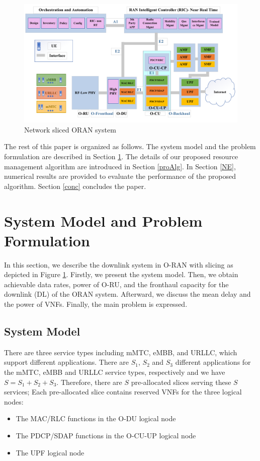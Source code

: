 \documentclass[conference]{IEEEtran}
\begin{document}
\begin{figure}
  \centering 
    \includegraphics[scale = 0.7]{finalDraw.pdf}
  \caption{Network sliced ORAN system}
  \label{fig:c11}
\end{figure}

The rest of this paper is organized as follows. The system model and the problem formulation are described in Section \ref{systemmodel}. The details of our proposed resource management algorithm are introduced in Section \ref{proAlg}. In Section \ref{NE}, numerical results are provided to evaluate the performance of the proposed algorithm. Section \ref{conc} concludes the  paper.

\section{System Model and Problem Formulation}\label{systemmodel}

In this section, we describe the downlink system in O-RAN with slicing as depicted in Figure \ref{fig:c11}. 
Firstly, we present the system model. Then, we obtain achievable data rates, power of O-RU, and the fronthaul capacity for the downlink (DL) of the ORAN system. Afterward, we discuss the mean delay and the power of VNFs.
Finally, the main problem is expressed.
\subsection{System Model}
There are three service types including mMTC, eMBB, and URLLC, which support different applications. There are $S_1$, $S_2$ and $S_3$ different applications for the mMTC, eMBB and URLLC service types, respectively and we have $S = S_1 + S_2 + S_3$. 
Therefore, there are $S$ pre-allocated slices serving these $S$ services;
Each pre-allocated slice contains reserved VNFs for the three logical nodes:
\begin{itemize}
\item The MAC/RLC functions in the O-DU logical node
\item The PDCP/SDAP functions in the O-CU-UP logical node
\item The UPF logical node
\end{itemize}
\end{document}
